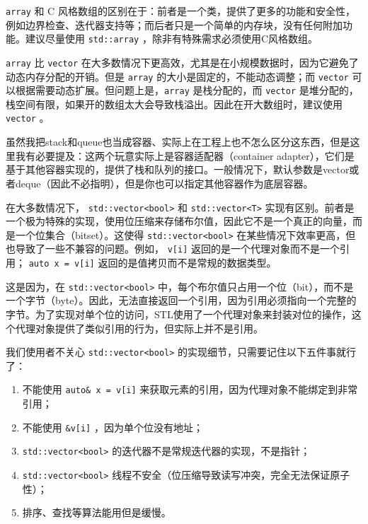 \begin{tip}
    \texttt{array} 和 C 风格数组的区别在于：前者是一个类，提供了更多的功能和安全性，例如边界检查、迭代器支持等；而后者只是一个简单的内存块，没有任何附加功能。建议尽量使用 \texttt{std::array} ，除非有特殊需求必须使用C风格数组。

    \texttt{array} 比 \texttt{vector} 在大多数情况下更高效，尤其是在小规模数据时，因为它避免了动态内存分配的开销。但是 \texttt{array} 的大小是固定的，不能动态调整；而 \texttt{vector} 可以根据需要动态扩展。但问题上是，\texttt{array} 是栈分配的，而 \texttt{vector} 是堆分配的，栈空间有限，如果开的数组太大会导致栈溢出。因此在开大数组时，建议使用 \texttt{vector} 。
\end{tip}

\begin{note}
  虽然我把stack和queue也当成容器、实际上在工程上也不怎么区分这东西，但是这里我有必要提及：这两个玩意实际上是容器适配器（container adapter），它们是基于其他容器实现的，提供了栈和队列的接口。一般情况下，默认参数是vector或者deque（因此不必指明），但是你也可以指定其他容器作为底层容器。
\end{note}

\begin{note}
  在大多数情况下， \texttt{std::vector<bool>} 和 \texttt{std::vector<T>} 实现有区别。前者是一个极为特殊的实现，使用位压缩来存储布尔值，因此它不是一个真正的向量，而是一个位集合（bitset）。这使得 \texttt{std::vector<bool>} 在某些情况下效率更高，但也导致了一些不兼容的问题。例如， \texttt{v[i]} 返回的是一个代理对象而不是一个引用； \texttt{auto x = v[i]} 返回的是值拷贝而不是常规的数据类型。

  这是因为，在 \texttt{std::vector<bool>} 中，每个布尔值只占用一个位（bit），而不是一个字节（byte）。因此，无法直接返回一个引用，因为引用必须指向一个完整的字节。为了实现对单个位的访问，STL使用了一个代理对象来封装对位的操作，这个代理对象提供了类似引用的行为，但实际上并不是引用。

  我们使用者不关心 \texttt{std::vector<bool>} 的实现细节，只需要记住以下五件事就行了：
  \begin{enumerate}
    \item 不能使用 \texttt{auto\& x = v[i]} 来获取元素的引用，因为代理对象不能绑定到非常引用；
    \item 不能使用 \texttt{\&v[i]} ，因为单个位没有地址；
    \item  \texttt{std::vector<bool>} 的迭代器不是常规迭代器的实现，不是指针；
    \item  \texttt{std::vector<bool>} 线程不安全（位压缩导致读写冲突，完全无法保证原子性）；
    \item 排序、查找等算法能用但是缓慢。
  \end{enumerate}
\end{note}

